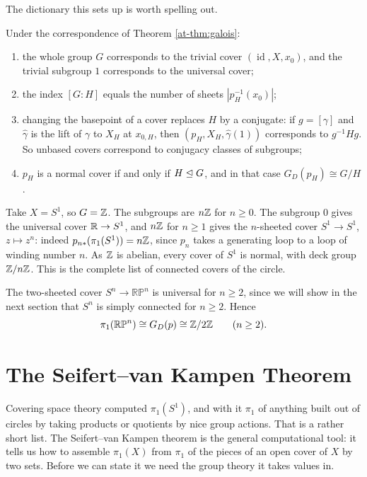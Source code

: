 \documentclass[a4paper]{scrartcl}
\newcommand{\id}{\operatorname{id}}
\newcommand{\RP}{\mathbb{RP}}
\begin{document}
The dictionary this sets up is worth spelling out.

\begin{remark} \label{rmk:galois-dictionary}
	Under the correspondence of Theorem \ref{at-thm:galois}:
	\begin{enumerate}
		\item the whole group $G$ corresponds to the trivial cover $(\id, X, x_0)$, and the trivial subgroup $1$ corresponds to the universal cover;
		\item the index $[G:H]$ equals the number of sheets $|p_H^{-1}(x_0)|$;
		\item changing the basepoint of a cover replaces $H$ by a conjugate: if $g = [\gamma]$ and $\hat\gamma$ is the lift of $\gamma$ to $X_H$ at $x_{0,H}$, then $(p_H, X_H, \hat\gamma(1))$ corresponds to $g^{-1}Hg$. So unbased covers correspond to conjugacy classes of subgroups;
		\item $p_H$ is a normal cover if and only if $H \trianglelefteq G$, and in that case $G_D(p_H) \cong G/H$.
	\end{enumerate}
\end{remark}

\begin{example}
	Take $X = S^1$, so $G = \mathbb{Z}$. The subgroups are $n\mathbb{Z}$ for $n \geq 0$. The subgroup $0$ gives the universal cover $\mathbb{R} \to S^1$, and $n\mathbb{Z}$ for $n \geq 1$ gives the $n$-sheeted cover $S^1 \to S^1$, $z \mapsto z^n$: indeed $p_{n*}(\pi_1(S^1)) = n\mathbb{Z}$, since $p_n$ takes a generating loop to a loop of winding number $n$. As $\mathbb{Z}$ is abelian, every cover of $S^1$ is normal, with deck group $\mathbb{Z}/n\mathbb{Z}$. This is the complete list of connected covers of the circle.
\end{example}

\begin{example}
	The two-sheeted cover $S^n \to \RP^n$ is universal for $n \geq 2$, since we will show in the next section that $S^n$ is simply connected for $n \geq 2$. Hence
	$$
	\pi_1(\RP^n) \cong G_D(p) \cong \Z/2\Z \qquad (n \geq 2).
	$$
\end{example}

\section{The Seifert--van Kampen Theorem}

Covering space theory computed $\pi_1(S^1)$, and with it $\pi_1$ of anything built out of
circles by taking products or quotients by nice group actions. That is a rather short
list. The Seifert--van Kampen theorem is the general computational tool: it tells us how
to assemble $\pi_1(X)$ from $\pi_1$ of the pieces of an open cover of $X$ by two sets.
Before we can state it we need the group theory it takes values in.
\end{document}
